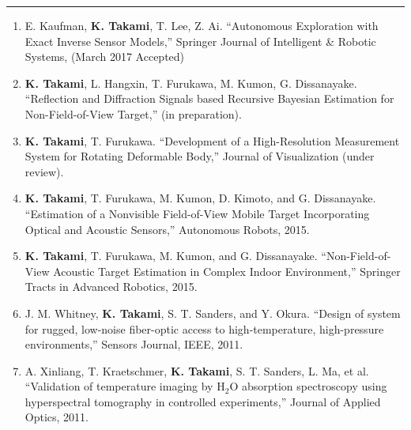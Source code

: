 \documentclass[11pt,letterpaper]{article}
\newcommand{\sect}[1]{\vspace{2mm}{\centering {\bf \large \scshape \uppercase{#1}} \par}  {\color{blue} \vskip 2mm \hrule height 1pt}\vspace{2mm}}
\begin{document}
\sect{Selected Journal Papers}
  \begin{enumerate}
  \item E. Kaufman, {\bf K. Takami}, T. Lee, Z. Ai. ``Autonomous Exploration with Exact Inverse Sensor Models,'' Springer Journal of Intelligent \& Robotic Systems, (March 2017 Accepted)

  \item {\bf K. Takami}, L. Hangxin, T. Furukawa, M. Kumon, G. Dissanayake. ``Reflection and Diffraction Signals based Recursive Bayesian Estimation for Non-Field-of-View Target,'' (in preparation).

  \item {\bf K. Takami}, T. Furukawa. ``Development of a High-Resolution Measurement System for Rotating Deformable Body,'' Journal of Visualization (under review).

  \item {\bf K. Takami}, T. Furukawa, M. Kumon, D. Kimoto, and G. Dissanayake. ``Estimation of a Nonvisible Field-of-View Mobile Target Incorporating Optical and Acoustic Sensors,'' Autonomous Robots, 2015.

  \item {\bf K. Takami}, T. Furukawa, M. Kumon, and G. Dissanayake. ``Non-Field-of-View Acoustic Target Estimation in Complex Indoor Environment,'' Springer Tracts in Advanced Robotics, 2015.

  \item J. M. Whitney, {\bf K. Takami}, S. T. Sanders, and Y. Okura. ``Design of system for rugged, low-noise fiber-optic access to high-temperature, high-pressure environments,'' Sensors Journal, IEEE, 2011.

  \item A. Xinliang, T. Kraetschmer, {\bf K. Takami}, S. T. Sanders, L. Ma, et al. ``Validation of temperature imaging by H$_2$O absorption spectroscopy using hyperspectral tomography in controlled experiments,'' Journal of Applied Optics, 2011.
\end{enumerate}
\end{document}
